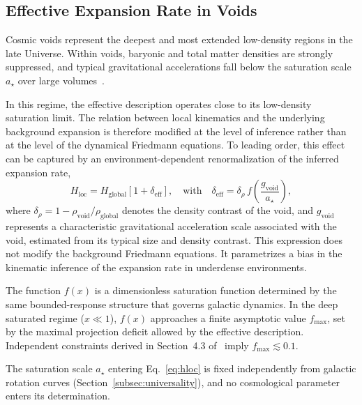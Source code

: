 \subsection{Effective Expansion Rate in Voids}
  \label{subsec:void_effect}

  Cosmic voids represent the deepest and most extended low-density regions in the late Universe.
  Within voids, baryonic and total matter densities are strongly suppressed,
  and typical gravitational accelerations fall below the saturation scale $a_\star$
  over large volumes~\cite{Keenan2013KBC}.

  In this regime, the effective description operates close to its
  low-density saturation limit.
  The relation between local kinematics and the underlying background expansion
  is therefore modified at the level of inference rather than at the level of
  the dynamical Friedmann equations.
  To leading order, this effect can be captured by an environment-dependent
  renormalization of the inferred expansion rate,
  \begin{equation}
    H_{\mathrm{loc}}
    =
    H_{\mathrm{global}}
    \left[
      1
      +
      \delta_{\mathrm{eff}}
    \right],
    \quad \text{with} \quad
    \delta_{\mathrm{eff}}
    =
    \delta_\rho \,
    f\!\left(
         \frac{g_{\mathrm{void}}}{a_\star}
    \right),
    \label{eq:hloc}
  \end{equation}
  where
  $\delta_\rho = 1 - \rho_{\mathrm{void}}/\rho_{\mathrm{global}}$
  denotes the density contrast of the void, and $g_{\mathrm{void}}$ represents a characteristic gravitational
  acceleration scale associated with the void, estimated from its typical size and density contrast.
  This expression does not modify the background Friedmann equations.
  It parametrizes a bias in the kinematic inference of the expansion rate in underdense environments.

  The function $f(x)$ is a dimensionless saturation function
  determined by the same bounded-response structure that governs
  galactic dynamics.
  In the deep saturated regime ($x \ll 1$),
  $f(x)$ approaches a finite asymptotic value $f_{\max}$,
  set by the maximal projection deficit allowed by the effective description.
  Independent constraints derived in Section~4.3 of~\cite{Beau2026c}
  imply $f_{\max} \lesssim 0.1$.

  The saturation scale $a_\star$ entering Eq.~\eqref{eq:hloc}
  is fixed independently from galactic rotation curves
  (Section~\ref{subsec:universality}),
  and no cosmological parameter enters its determination.

